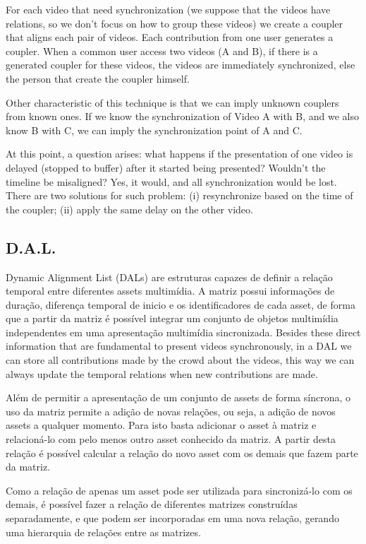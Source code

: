 \documentclass{sig-alternate-05-2015}
\begin{document}
For each video that need synchronization (we suppose that the videos have relations, so we don't focus on how to group these videos) we create a coupler that aligns each pair of videos. Each contribution from one user generates a coupler. When a common user access two videos (A and B), if there is a generated coupler for these videos, the videos are immediately synchronized, else the person that create the coupler himself.

Other characteristic of this technique is that we can imply unknown couplers from known ones. If we know the synchronization of Video A with B, and we also know B with C, we can imply the synchronization point of A and C.

At this point, a question arises: what happens if the presentation of one video is delayed (stopped to buffer) after it started being presented? Wouldn’t the timeline be misaligned? Yes, it would, and all synchronization would be lost. There are two solutions for such problem: (i) resynchronize based on the time of the coupler; (ii) apply the same delay on the other video.

\subsection{D.A.L.}

Dynamic Alignment List (DALs) are estruturas capazes de definir a relação temporal entre diferentes assets multimídia. 
A matriz possui informações de duração, diferença temporal de inicio e os identificadores  de cada asset, de forma que a partir da matriz é possível integrar um conjunto de objetos multimídia independentes em uma apresentação multimídia sincronizada. Besides these direct information that are fundamental to present videos synchronously, in a DAL we can store all contributions made by the crowd about the videos, this way we can always update the temporal relations when new contributions are made.

Além de permitir a apresentação de um conjunto de assets de forma síncrona, o uso da matriz permite a adição de novas relações, ou seja, a adição de novos assets a qualquer momento. Para isto basta adicionar o asset à matriz e relacioná-lo com pelo menos outro asset conhecido da matriz. A partir desta relação é possível calcular a relação do novo asset com os demais que fazem parte da matriz. 

Como a relação de apenas um asset pode ser utilizada para sincronizá-lo com os demais, é possível fazer a relação de diferentes matrizes construídas separadamente, e que podem ser incorporadas em uma nova relação, gerando uma hierarquia de relações entre as matrizes.
\end{document}
